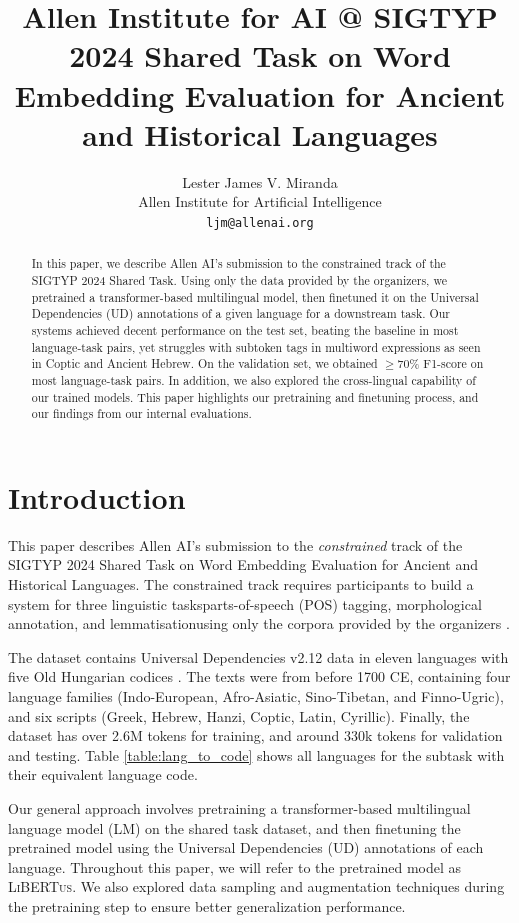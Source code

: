\documentclass[11pt]{article}
\title{Allen Institute for AI @ SIGTYP 2024 Shared Task on Word Embedding Evaluation for Ancient and Historical Languages}
\author{Lester James V. Miranda \\
  Allen Institute for Artificial Intelligence \\
  \texttt{ljm@allenai.org} \\
}
\newcommand{\libertus}{\textsc{LiBERTus}}
\newcommand{\teamname}{Allen AI}
\begin{document}
\maketitle

\begin{abstract}
  In this paper, we describe \teamname{}'s submission to the constrained track of the SIGTYP 2024 Shared Task.
  Using only the data provided by the organizers, we pretrained a transformer-based multilingual model, then finetuned it on the Universal Dependencies (UD) annotations of a given language for a downstream task.
  Our systems achieved decent performance on the test set, beating the baseline in most language-task pairs, yet struggles with subtoken tags in multiword expressions as seen in Coptic and Ancient Hebrew.
  On the validation set, we obtained $\geq$70\% F1-score on most language-task pairs.
  In addition, we also explored the cross-lingual capability of our trained models.
  This paper highlights our pretraining and finetuning process, and our findings from our internal evaluations.
\end{abstract}

\section{Introduction}
This paper describes \teamname{}'s submission to the \textit{constrained} track of the SIGTYP 2024 Shared Task on Word Embedding Evaluation for Ancient and Historical Languages.
The constrained track requires participants to build a system for three linguistic tasks\textemdash parts-of-speech (POS) tagging, morphological annotation, and lemmatisation\textemdash using only the corpora provided by the organizers \cite{dereza-etal-2024-findings}.



The dataset contains Universal Dependencies v2.12 data \cite{zeman-etal-2023-universal} in eleven languages with five Old Hungarian codices \cite{has-2018-hungarian}.
The texts were from before 1700 CE, containing four language families (Indo-European, Afro-Asiatic, Sino-Tibetan, and Finno-Ugric), and six scripts (Greek, Hebrew, Hanzi, Coptic, Latin, Cyrillic).
Finally, the dataset has over 2.6M tokens for training, and around 330k tokens for validation and testing.
Table \ref{table:lang_to_code} shows all languages for the subtask with their equivalent language code.

Our general approach involves pretraining a transformer-based multilingual language model (LM) on the shared task dataset, and then finetuning the pretrained model using the Universal Dependencies (UD) annotations of each language.
Throughout this paper, we will refer to the pretrained model as \libertus{}.
We also explored data sampling and augmentation techniques during the pretraining step to ensure better generalization performance.
\end{document}
